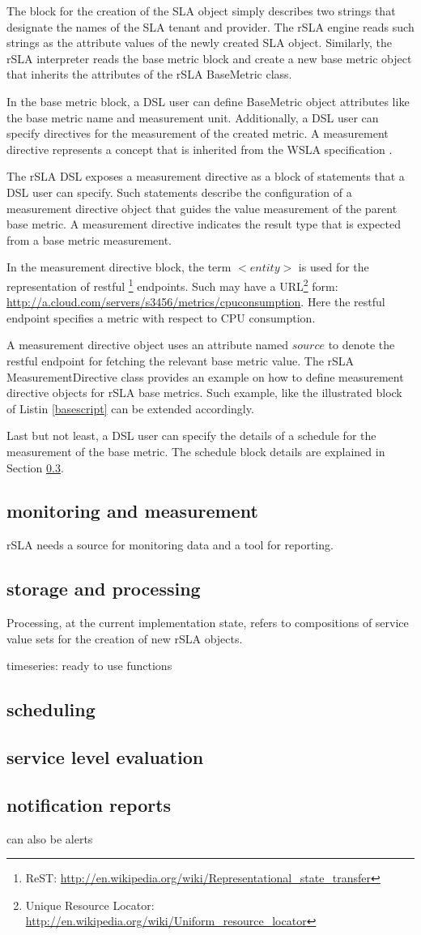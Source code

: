The block for the creation of the SLA object simply describes two strings that designate the names of the SLA tenant and provider. The rSLA engine reads such strings as the attribute values of the newly created SLA object. Similarly, the rSLA interpreter reads the base metric block and create a new base metric object that inherits the attributes of the rSLA BaseMetric class. 

In the base metric block, a DSL user can define BaseMetric object attributes like the base metric name and measurement unit. Additionally, a DSL user can specify directives for the measurement of the created metric. A measurement directive represents a concept that is inherited from the WSLA specification \cite{wsla}. 

The rSLA DSL exposes a measurement directive as a block of statements that a DSL user can specify. Such statements describe the configuration of a measurement directive object that guides the value measurement of the parent base metric. A measurement directive indicates the result type that is expected from a base metric measurement.

In the measurement directive block, the term $<entity>$ is used for the representation of restful \footnote{ReST: \url{http://en.wikipedia.org/wiki/Representational_state_transfer}} endpoints. Such may have a URL\footnote{Unique Resource Locator: \url{http://en.wikipedia.org/wiki/Uniform_resource_locator}} form: \url{http://a.cloud.com/servers/s3456/metrics/cpuconsumption}. Here the restful endpoint specifies a metric with respect to CPU consumption. 

A measurement directive object uses an attribute named $source$ to denote the restful endpoint for fetching the relevant base metric value. The rSLA MeasurementDirective class provides an example on how to define measurement directive objects for rSLA base metrics. Such example, like the illustrated block of Listin \ref{basescript} can be extended accordingly. 

Last but not least, a DSL user can specify the details of a schedule for the measurement of the base metric. The schedule block details are explained in Section \ref{schedule}.

\subsection{monitoring and measurement}
rSLA needs a source for monitoring data and a tool for reporting.
\subsection{storage and processing}
Processing, at the current implementation state, refers to compositions of service value sets for the creation of new rSLA objects.

timeseries: ready to use functions
\subsection{scheduling}\label{schedule}

\subsection{service level evaluation}

\subsection{notification reports}
can also be alerts